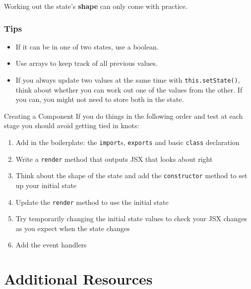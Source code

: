 Working out the state's \textbf{shape} can only come with practice.

\subsubsection{Tips}

\begin{itemize}
    \item If it can be in one of two states, use a boolean.
    \item Use arrays to keep track of all previous values.
    \item If you always update two values at the same time with \texttt{this.setState()}, think about whether you can work out one of the values from the other. If you can, you might not need to store both in the state.
\end{itemize}




\begin{infobox}{Creating a Component}
    If you do things in the following order and test at each stage you should avoid getting tied in knots:

    \begin{enumerate}
        \item Add in the boilerplate: the \texttt{import}s, \texttt{exports} and basic \texttt{class} declaration
        \item Write a \texttt{render} method that outputs JSX that looks about right
        \item Think about the shape of the state and add the \texttt{constructor} method to set up your initial state
        \item Update the \texttt{render} method to use the initial state
        \item Try temporarily changing the initial state values to check your JSX changes as you expect when the state changes
        \item Add the event handlers
    \end{enumerate}
\end{infobox}




\section{Additional Resources}

